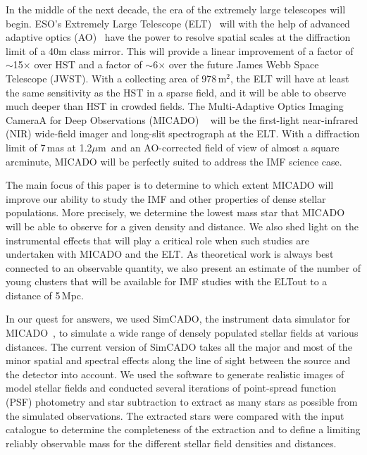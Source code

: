 \documentclass[referee]{aa}
\newcommand{\um}{$\mu$m~}
\newcommand{\s}{$\sim$}
\newcommand{\h}[1]{$^{#1}$}
\begin{document}
In the middle of the next decade, the era of the extremely large telescopes will begin.
ESO's Extremely Large Telescope (ELT)~\citep{eelt} will with the help of advanced adaptive optics (AO)~\citep{maory} have the power to resolve spatial scales at the diffraction limit of a 40m class mirror.
This will provide a linear improvement of a factor of \s15$\times$ over HST and a factor of \s6$\times$ over the future James Webb Space Telescope (JWST).
With a collecting area of 978\,m\h2, the ELT will have at least the same sensitivity as the HST in a sparse field, and it will be able to observe much deeper than HST in crowded fields.
The Multi-Adaptive Optics Imaging CameraA for Deep Observations (MICADO) ~\citep{micado2016, micado2018} will be the first-light near-infrared (NIR) wide-field imager and long-slit spectrograph at the ELT\@.
With a diffraction limit of 7\,mas at 1.2\um and an AO-corrected field of view of almost a square arcminute, MICADO will be perfectly suited to address the IMF science case.

The main focus of this paper is to determine to which extent MICADO will improve our ability to study the IMF and other properties of dense stellar populations.
More precisely, we determine the lowest mass star that MICADO will be able to observe for a given density and distance.
We also shed light on the instrumental effects that will play a critical role when such studies are undertaken with MICADO and the ELT.
As theoretical work is always best connected to an observable quantity, we also present an estimate of the number of young clusters that will be available for IMF studies with the ELT\@ out to a distance of 5\,Mpc.

In our quest for answers, we used SimCADO, the instrument data simulator for MICADO~\citep{leschinski2016, leschinski19}, to simulate a wide range of densely populated stellar fields at various distances.
The current version of SimCADO takes all the major and most of the minor spatial and spectral effects along the line of sight between the source and the detector into account.
We used the software to generate realistic images of model stellar fields and  conducted several iterations of point-spread function (PSF) photometry and star subtraction to extract as many stars as possible from the simulated observations.
The extracted stars were compared with the input catalogue to determine the completeness of the extraction and to define a limiting reliably observable mass for the different stellar field densities and distances.
\end{document}
